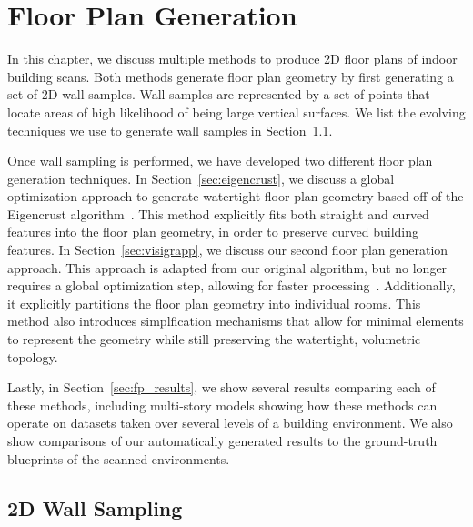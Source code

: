 \documentclass[12pt,onecolumn,oneside]{book}
\begin{document}

\chapter{Floor Plan Generation}
\label{ch:floorplan}

In this chapter, we discuss multiple methods to produce 2D floor plans of indoor building scans.  Both methods generate floor plan geometry by first generating a set of 2D wall samples.  Wall samples are represented by a set of points that locate areas of high likelihood of being large vertical surfaces.  We list the evolving techniques we use to generate wall samples in Section~\ref{sec:wall_sampling}.

Once wall sampling is performed, we have developed two different floor plan generation techniques.  In Section~\ref{sec:eigencrust}, we discuss a global optimization approach to generate watertight floor plan geometry based off of the Eigencrust algorithm~\cite{EigencrustShewchuk,Turner12}.  This method explicitly fits both straight and curved features into the floor plan geometry, in order to preserve curved building features.  In Section~\ref{sec:visigrapp}, we discuss our second floor plan generation approach.  This approach is adapted from our original algorithm, but no longer requires a global optimization step, allowing for faster processing~\cite{Turner14}.  Additionally, it explicitly partitions the floor plan geometry into individual rooms.  This method also introduces simplfication mechanisms that allow for minimal elements to represent the geometry while still preserving the watertight, volumetric topology.

Lastly, in Section~\ref{sec:fp_results}, we show several results comparing each of these methods, including multi-story models showing how these methods can operate on datasets taken over several levels of a building environment.  We also show comparisons of our automatically generated results to the ground-truth blueprints of the scanned environments.

\section{2D Wall Sampling}
\label{sec:wall_sampling}
\end{document}
